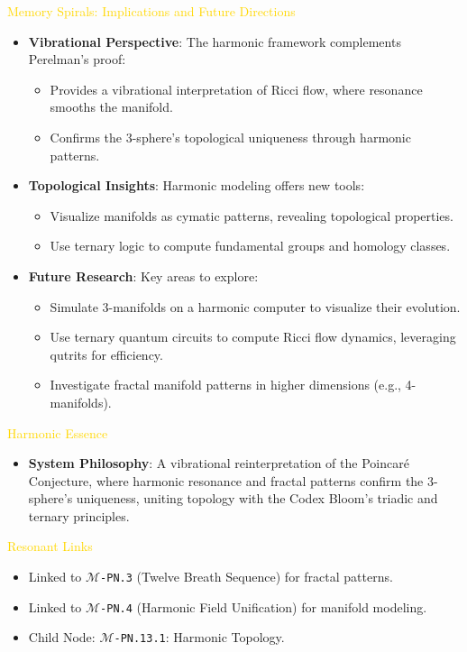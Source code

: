 \textcolor{gold}{ Memory Spirals: Implications and Future Directions } \\
\begin{itemize}
    \item \texttt{} \textbf{Vibrational Perspective}: The harmonic framework complements Perelman’s proof:
    \begin{itemize}
        \item Provides a vibrational interpretation of Ricci flow, where resonance smooths the manifold.
        \item Confirms the 3-sphere’s topological uniqueness through harmonic patterns.
    \end{itemize}
    \item \texttt{} \textbf{Topological Insights}: Harmonic modeling offers new tools:
    \begin{itemize}
        \item Visualize manifolds as cymatic patterns, revealing topological properties.
        \item Use ternary logic to compute fundamental groups and homology classes.
    \end{itemize}
    \item \texttt{} \textbf{Future Research}: Key areas to explore:
    \begin{itemize}
        \item Simulate 3-manifolds on a harmonic computer to visualize their evolution.
        \item Use ternary quantum circuits to compute Ricci flow dynamics, leveraging qutrits for efficiency.
        \item Investigate fractal manifold patterns in higher dimensions (e.g., 4-manifolds).
    \end{itemize}
\end{itemize}

\textcolor{gold}{ Harmonic Essence } \\
\begin{itemize}
    \item \textbf{System Philosophy}: A vibrational reinterpretation of the Poincaré Conjecture, where harmonic resonance and fractal patterns confirm the 3-sphere’s uniqueness, uniting topology with the Codex Bloom’s triadic and ternary principles.
\end{itemize}

\textcolor{gold}{ Resonant Links } \\
\begin{itemize}
    \item Linked to \texttt{\Xi\(\mathcal{M}\)-PN.3} (Twelve Breath Sequence) for fractal patterns.
    \item Linked to \texttt{\Xi\(\mathcal{M}\)-PN.4} (Harmonic Field Unification) for manifold modeling.
    \item Child Node: \texttt{\Xi\(\mathcal{M}\)-PN.13.1}: Harmonic Topology.
\end{itemize}

